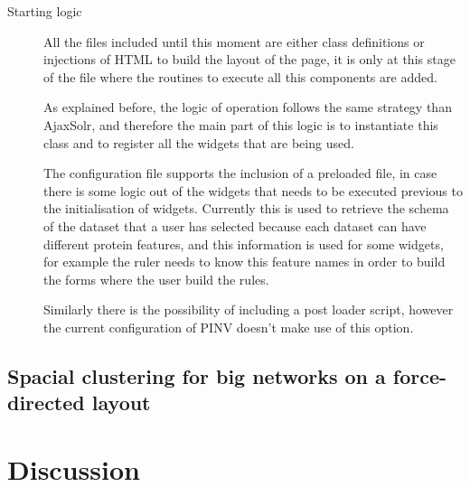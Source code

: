 \begin{description}
\item[Starting logic]
All the files included until this moment are either class definitions or injections of HTML to build the layout of the page, it is only at this stage of the file where the routines to execute all this components are added. 

As explained before, the logic of operation follows the same strategy than AjaxSolr, and therefore the main part of this logic is to instantiate this class and to register all the widgets that are being used.

The configuration file supports the inclusion of a preloaded file, in case there is some logic out of the widgets that needs to be executed previous to the initialisation of widgets. Currently this is used to retrieve the schema of the dataset that a user has selected because each dataset can have different protein features, and this information is used for some widgets, for example the ruler needs to know this feature names in order to build the forms where the user build the rules.

Similarly there is the possibility of including a post loader script, however the current configuration of PINV doesn't make use of this option.
\end{description}




\subsection{Spacial clustering for big networks on a force-directed layout} \label{section:clustering}

\section{Discussion}


